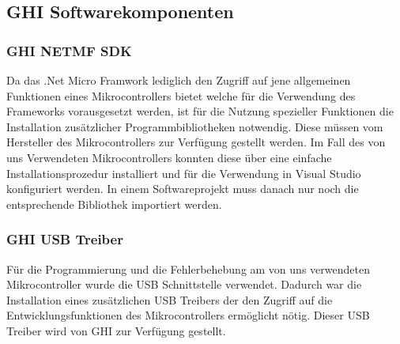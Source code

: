 \subsection{GHI Softwarekomponenten}
\subsubsection{GHI NETMF SDK}
Da das .Net Micro Framwork lediglich den Zugriff auf jene allgemeinen Funktionen eines Mikrocontrollers bietet welche für die Verwendung des Frameworks vorausgesetzt werden, ist für die Nutzung spezieller Funktionen die Installation zusätzlicher Programmbibliotheken notwendig. Diese müssen vom Hersteller des Mikrocontrollers zur Verfügung gestellt werden. Im Fall des von uns Verwendeten Mikrocontrollers konnten diese über eine einfache Installationsprozedur installiert und für die Verwendung in Visual Studio konfiguriert werden. In einem Softwareprojekt muss danach nur noch die entsprechende Bibliothek importiert werden.

\subsubsection{GHI USB Treiber}
Für die Programmierung und die Fehlerbehebung am von uns verwendeten Mikrocontroller wurde die USB Schnittstelle verwendet. Dadurch war die Installation eines zusätzlichen USB Treibers der den Zugriff auf die Entwicklungsfunktionen des Mikrocontrollers ermöglicht nötig. Dieser USB Treiber wird von GHI zur Verfügung gestellt.